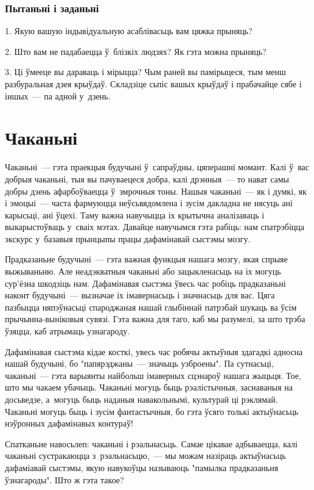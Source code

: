 \subsubsection{Пытаньні і заданьні}

1. Якую вашую індывідуальную асаблівасьць вам цяжка прыняць?

2. Што вам не падабаецца ў~блізкіх людзях? Як гэта можна прыняць?

3. Ці ўмееце вы дараваць і мірыцца? Чым раней вы памірыцеся, тым менш разбуральная дзея крыўдаў. Складзіце сьпіс вашых крыўдаў і прабачайце сябе і іншых~--- па адной у~дзень.


\section{Чаканьні}

Чаканьні~--- гэта праекцыя будучыні ў~сапраўдны, цяперашні момант. Калі ў~вас добрыя чаканьні, тыя вы пачуваецеся добра, калі дрэнныя~--- то нават самы добры дзень афарбоўваецца ў~змрочныя тоны. Нашыя чаканьні~--- як і думкі, як і эмоцыі~--- часта фармуюцца неўсьвядомлена і зусім дакладна не нясуць ані карысьці, ані ўцехі. Таму важна навучыцца іх крытычна аналізаваць і выкарыстоўваць у~сваіх мэтах. Давайце навучымся гэта рабіць: нам спатрэбіцца экскурс у~базавыя прынцыпы працы дафамінавай сыстэмы мозгу.

Прадказаньне будучыні~--- гэта важная функцыя нашага мозгу, якая спрыяе выжываньню. Але неадэкватныя чаканьні або зацыкленасьць на іх могуць сур'ёзна шкодзіць нам. Дафамінавая сыстэма ўвесь час робіць прадказаньні наконт будучыні~--- вызначае іх імавернасьць і значнасьць для вас. Цяга пазбыцца няпэўнасьці спароджаная нашай глыбіннай патрэбай шукаць ва ўсім прычынна-выніковыя сувязі. Гэта важна для таго, каб мы разумелі, за што трэба ўзяцца, каб атрымаць узнагароду.

Дафамінавая сыстэма кідае косткі, увесь час робячы актыўныя здагадкі адносна нашай будучыні, бо "папярэджаны~--- значыць узброены". Па сутнасьці, чаканьні~--- гэта варыянты найбольш імаверных сцэнароў нашага жыцьця. Тое, што мы чакаем убачыць. Чаканьні могуць быць рэалістычныя, заснаваныя на досьведзе, а~могуць быць наданыя навакольнымі, культурай ці рэклямай. Чаканьні могуць быць і зусім фантастычныя, бо гэта ўсяго толькі актыўнасьць нэўронных дафамінавых контураў!

Спатканьне навосьлеп: чаканьні і рэальнасьць. Самае цікавае адбываецца, калі чаканьні сустракаюцца з~рэальнасьцю,~--- мы можам назіраць актыўнасьць дафаміавай сыстэмы, якую навукоўцы называюць "памылка прадказаньня ўзнагароды". Што ж гэта такое?

